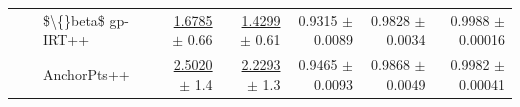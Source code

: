 \begin{longtable}{llp{}rrrrr}
 &  & \$\textbackslash\{\}beta\$ gp-IRT++ & \underline{1.6785} {\scriptsize $\pm$ 0.66} & \underline{1.4299} {\scriptsize $\pm$ 0.61} & 0.9315 {\scriptsize $\pm$ 0.0089} & 0.9828 {\scriptsize $\pm$ 0.0034} & 0.9988 {\scriptsize $\pm$ 0.00016} \\
 &  & AnchorPts++ & \underline{2.5020} {\scriptsize $\pm$ 1.4} & \underline{2.2293} {\scriptsize $\pm$ 1.3} & 0.9465 {\scriptsize $\pm$ 0.0093} & 0.9868 {\scriptsize $\pm$ 0.0049} & 0.9982 {\scriptsize $\pm$ 0.00041} \\
\end{longtable}
